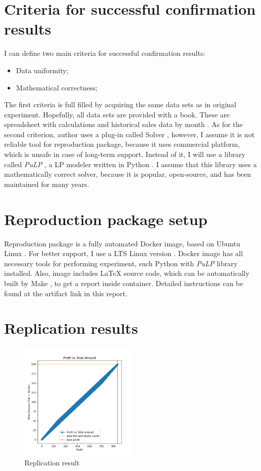 \documentclass[sigconf, nonacm]{acmart}
\begin{document}
\section{Criteria for successful confirmation results}

I can define two main criteria for successful confirmation results:
\begin{itemize}
    \item Data uniformity;
    \item Mathematical correctness;
\end{itemize}

The first criteria is full filled by acquiring the same data sets as in original experiment. Hopefully, all data sets are provided with a book. These are spreadsheet with calculations \cite{BathingFriendsUnlimited} and historical sales data by month \cite{HistoricalSalesData}. As for the second criterion, author uses a plug-in called Solver \cite{Solver}, however, I assume it is not reliable tool for reproduction package, because it uses commercial platform, which is unsafe in case of long-term support. Instead of it, I will use a library called \textit{PuLP} \cite{PuLP}, a LP modeler written in Python \cite{Python}. I assume that this library uses a mathematically correct solver, because it is popular, open-source, and has been maintained for many years.

\section{Reproduction package setup}
Reproduction package is a fully automated Docker \cite{Docker} image, based on Ubuntu Linux \cite{DockerUbuntu}. For better support, I use a LTS Linux version \cite{LtsReleases}. Docker \cite{Docker} image has all necessary tools for performing experiment, such Python \cite{Python} with \textit{PuLP} \cite{PuLP} library installed. Also, image includes LaTeX \cite{LaTeX} source code, which can be automatically built by Make \cite{Make}, to get a report inside container. Detailed instructions can be found at the artifact link in this report.

\section{Replication results}
\begin{figure}
  \centering
  \includegraphics[width=0.5\textwidth]{figures/result_plot.png} 
  \caption{Replication result}
  \label{fig:yourlabel}
\end{figure}
\end{document}
